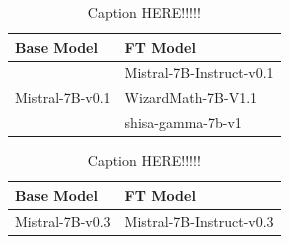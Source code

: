

\usepackage{multirow}
\usepackage[x11names, dvipsnames, svgnames, table, html]{xcolor}





\begin{table}[h]
\centering
\caption{Caption HERE!!!!!}
\label{tab:hoge}
\begin{tabular}{l|l}
\hline \hline
Base Model                       & FT Model                 \\ \hline
\multirow{3}{*}{Mistral-7B-v0.1} & Mistral-7B-Instruct-v0.1 \\
                                 & WizardMath-7B-V1.1       \\
                                 & shisa-gamma-7b-v1        \\ \hline \hline
\end{tabular}
\end{table}

\begin{table}[h]
\centering
\caption{Caption HERE!!!!!}
\label{tab:hogehoge}
\begin{tabular}{l|l}
\hline \hline
Base Model      & FT Model                 \\ \hline
Mistral-7B-v0.3 & Mistral-7B-Instruct-v0.3 \\ \hline \hline
\end{tabular}
\end{table}





